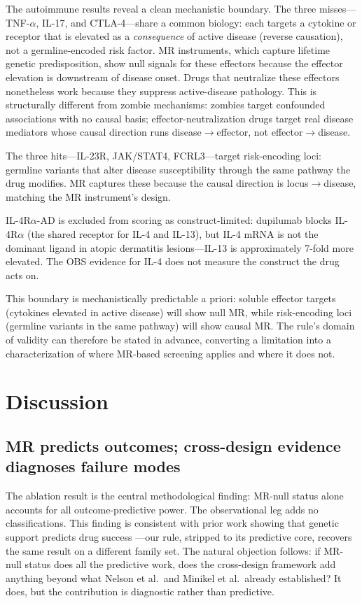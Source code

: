\documentclass[11pt]{article}
\begin{document}
The autoimmune results reveal a clean mechanistic boundary. The three misses---TNF-$\alpha$, IL-17, and CTLA-4---share a common biology: each targets a cytokine or receptor that is elevated as a \emph{consequence} of active disease (reverse causation), not a germline-encoded risk factor. MR instruments, which capture lifetime genetic predisposition, show null signals for these effectors because the effector elevation is downstream of disease onset. Drugs that neutralize these effectors nonetheless work because they suppress active-disease pathology. This is structurally different from zombie mechanisms: zombies target confounded associations with no causal basis; effector-neutralization drugs target real disease mediators whose causal direction runs disease$\to$effector, not effector$\to$disease.

The three hits---IL-23R, JAK/STAT4, FCRL3---target risk-encoding loci: germline variants that alter disease susceptibility through the same pathway the drug modifies. MR captures these because the causal direction is locus$\to$disease, matching the MR instrument's design.

IL-4R$\alpha$-AD is excluded from scoring as construct-limited: dupilumab blocks IL-4R$\alpha$ (the shared receptor for IL-4 and IL-13), but IL-4 mRNA is not the dominant ligand in atopic dermatitis lesions---IL-13 is approximately 7-fold more elevated. The OBS evidence for IL-4 does not measure the construct the drug acts on.

This boundary is mechanistically predictable a priori: soluble effector targets (cytokines elevated in active disease) will show null MR, while risk-encoding loci (germline variants in the same pathway) will show causal MR. The rule's domain of validity can therefore be stated in advance, converting a limitation into a characterization of where MR-based screening applies and where it does not.

\section{Discussion}

\subsection{MR predicts outcomes; cross-design evidence diagnoses failure modes}

The ablation result is the central methodological finding: MR-null status alone accounts for all outcome-predictive power. The observational leg adds no classifications. This finding is consistent with prior work showing that genetic support predicts drug success \cite{nelson2015,minikel2024}---our rule, stripped to its predictive core, recovers the same result on a different family set. The natural objection follows: if MR-null status does all the predictive work, does the cross-design framework add anything beyond what Nelson et al.\ and Minikel et al.\ already established? It does, but the contribution is diagnostic rather than predictive.
\end{document}
